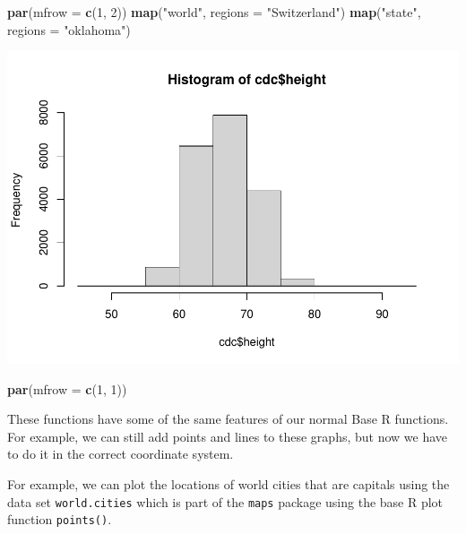 \documentclass[
]{book}
\newenvironment{Shaded}{\begin{snugshade}}{\end{snugshade}}
\newcommand{\DataTypeTok}[1]{\textcolor[rgb]{0.13,0.29,0.53}{#1}}
\newcommand{\DecValTok}[1]{\textcolor[rgb]{0.00,0.00,0.81}{#1}}
\newcommand{\KeywordTok}[1]{\textcolor[rgb]{0.13,0.29,0.53}{\textbf{#1}}}
\newcommand{\NormalTok}[1]{#1}
\newcommand{\OperatorTok}[1]{\textcolor[rgb]{0.81,0.36,0.00}{\textbf{#1}}}
\newcommand{\StringTok}[1]{\textcolor[rgb]{0.31,0.60,0.02}{#1}}
\begin{document}
\begin{Shaded}
\begin{Highlighting}[]
\KeywordTok{par}\NormalTok{(}\DataTypeTok{mfrow =} \KeywordTok{c}\NormalTok{(}\DecValTok{1}\NormalTok{, }\DecValTok{2}\NormalTok{))}
\KeywordTok{map}\NormalTok{(}\StringTok{"world"}\NormalTok{, }\DataTypeTok{regions =} \StringTok{"Switzerland"}\NormalTok{)}
\KeywordTok{map}\NormalTok{(}\StringTok{"state"}\NormalTok{, }\DataTypeTok{regions =} \StringTok{"oklahoma"}\NormalTok{)}
\end{Highlighting}
\end{Shaded}

\includegraphics{_main_files/figure-latex/unnamed-chunk-196-1.pdf}

\begin{Shaded}
\begin{Highlighting}[]
\KeywordTok{par}\NormalTok{(}\DataTypeTok{mfrow =} \KeywordTok{c}\NormalTok{(}\DecValTok{1}\NormalTok{, }\DecValTok{1}\NormalTok{))}
\end{Highlighting}
\end{Shaded}

These functions have some of the same features of our normal Base R functions. For example, we can still add points and lines to these graphs, but now we have to do it in the correct coordinate system.

For example, we can plot the locations of world cities that are capitals using the data set \texttt{world.cities} which is part of the \texttt{maps} package using the base R plot function \texttt{points()}.

\begin{Shaded}
\end{Shaded}
\end{document}
